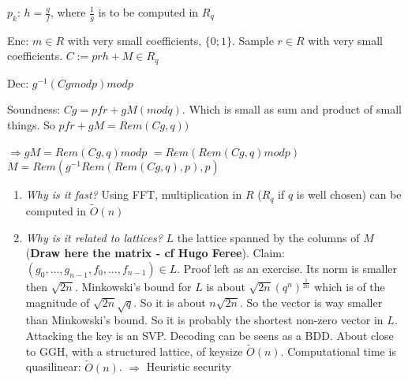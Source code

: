 \documentclass[11pt]{article}
\begin{document}
$p_k$: $h=\frac{g}{f}$, where $\frac{1}{g}$ is to be computed in $R_q$

Enc: $m \in R$ with very small coefficients, $\{0;1\}$. Sample $r \in R$ with very small coefficients. $C := p r h +M \in R_q$

Dec: $g^{-1} (C g mod p) mod p$

Soundness: $C g= p f r + g M (mod q)$. Which is small as sum and product of small things.
So $p f r+g M= Rem(C g,q))$

$\Rightarrow g M = Rem (C g, q) mod p$
$= Rem (Rem(C g,q) mod p)$
$M = Rem(g^{-1} Rem(Rem (C g, q),p),p)$

\begin{enumerate}
\item \textit{Why is it fast?}
Using FFT, multiplication in $R$ ($R_q$ if $q$ is well chosen) can be computed in $\tilde{O}(n)$
\item \textit{Why is it related to lattices?} $L$ the lattice spanned by the columns of $M$ (\textbf{Draw here the matrix - cf Hugo Feree}). Claim: $(g_0,...,g_{n-1},f_0,...,f_{n-1}) \in L$. Proof left as an exercise. Its norm is smaller then $\sqrt{2 n}$. Minkowski's bound for $L$ is about $\sqrt{2 n} (q^n)^{\frac{1}{2 n}}$ which is of the magnitude of $\sqrt{2 n} \sqrt{q}$. So it is about $n \sqrt{2 n}$. So the vector is way smaller than Minkowski's bound. So it is probably the shortest non-zero vector in $L$. Attacking the key is an SVP. Decoding can be seens as a BDD. About close to GGH, with a structured lattice, of keysize $\tilde{O}(n)$. Computational time is quasilinear: $\tilde{O}(n)$. $\Rightarrow$ Heuristic security
\end{enumerate}



\end{document}
